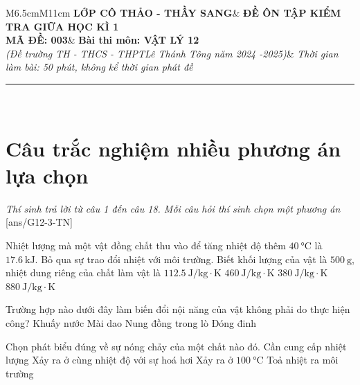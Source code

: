 \begin{tabular}{M{6.5cm}M{11cm}}
	\textbf{LỚP CÔ THẢO - THẦY SANG}& \textbf{ĐỀ ÔN TẬP KIỂM TRA GIỮA HỌC KÌ 1}\\
	\textbf{MÃ ĐỀ: 003}& \textbf{Bài thi môn: VẬT LÝ 12}\\
	\textit{(Đề trường TH - THCS - THPT\newline Lê Thánh Tông năm 2024 -2025)}& \textit{Thời gian làm bài: 50 phút, không kể thời gian phát đề}
	
	\noindent\rule{4cm}{0.8pt} \\
\end{tabular}
\setcounter{section}{0}
\section{Câu trắc nghiệm nhiều phương án lựa chọn}
\textit{Thí sinh trả lời từ câu 1 đến câu 18. Mỗi câu hỏi thí sinh chọn một phương án}
\setcounter{ex}{0}
[ans/G12-3-TN]
\begin{ex}
	Nhiệt lượng mà một vật đồng chất thu vào để tăng nhiệt độ thêm $\SI{40}{\celsius}$ là $\SI{17.6}{\kilo\joule}$. Bỏ qua sự trao đổi nhiệt với môi trường. Biết khối lượng của vật là $\SI{500}{\gram}$, nhiệt dung riêng của chất làm vật là	
	\choice
	{$\SI{112.5}{\joule/\kilogram\cdot\kelvin}$}
	{$\SI{460}{\joule/\kilogram\cdot\kelvin}$}
	{$\SI{380}{\joule/\kilogram\cdot\kelvin}$}
	{\True $\SI{880}{\joule/\kilogram\cdot\kelvin}$}
\end{ex}
\begin{ex}
	Trường hợp nào dưới đây làm biến đổi nội năng của vật không phải do thực hiện công?
	\choice
	{Khuấy nước}
	{Mài dao}
	{\True Nung đồng trong lò}
	{Đóng đinh}
	\loigiai{}
\end{ex}
\begin{ex}
	Chọn phát biểu đúng về sự nóng chảy của một chất nào đó.
	\choice
	{\True Cần cung cấp nhiệt lượng}
	{Xảy ra ở cùng nhiệt độ với sự hoá hơi}
	{Xảy ra ở $\SI{100}{\celsius}$}
	{Toả nhiệt ra môi trường}
	\loigiai{}
\end{ex}

